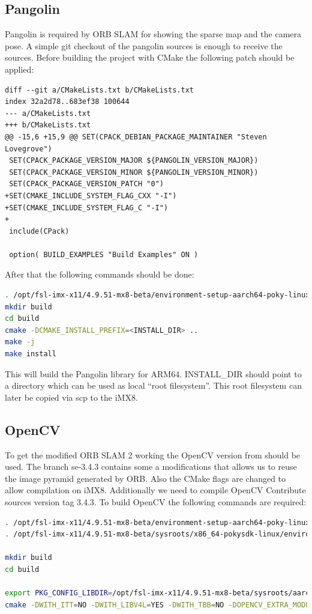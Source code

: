 \documentclass[11pt,a4paper,titlepage,oneside]{report}
\begin{document}
\subsection{Pangolin}
Pangolin \cite{pangolin} is required by ORB SLAM for showing the sparse map and the camera pose. A simple git checkout of the pangolin sources is enough to receive the sources. Before building the project with CMake the following patch should be applied:
\begin{lstlisting}
diff --git a/CMakeLists.txt b/CMakeLists.txt
index 32a2d78..683ef38 100644
--- a/CMakeLists.txt
+++ b/CMakeLists.txt
@@ -15,6 +15,9 @@ SET(CPACK_DEBIAN_PACKAGE_MAINTAINER "Steven Lovegrove")
 SET(CPACK_PACKAGE_VERSION_MAJOR ${PANGOLIN_VERSION_MAJOR})
 SET(CPACK_PACKAGE_VERSION_MINOR ${PANGOLIN_VERSION_MINOR})
 SET(CPACK_PACKAGE_VERSION_PATCH "0")
+SET(CMAKE_INCLUDE_SYSTEM_FLAG_CXX "-I")
+SET(CMAKE_INCLUDE_SYSTEM_FLAG_C "-I")
+
 include(CPack)
 
 option( BUILD_EXAMPLES "Build Examples" ON )
\end{lstlisting}

After that the following commands should be done:
\begin{lstlisting}[language=bash]
. /opt/fsl-imx-x11/4.9.51-mx8-beta/environment-setup-aarch64-poky-linux
mkdir build
cd build
cmake -DCMAKE_INSTALL_PREFIX=<INSTALL_DIR> ..
make -j
make install
\end{lstlisting}

This will build the Pangolin library for ARM64. INSTALL\_DIR should point to a directory which can be used as local ``root filesystem''. This root filesystem can later be copied via scp to the iMX8.

\subsection{OpenCV}\label{sec:opencv}
To get the modified ORB SLAM 2 working the OpenCV version from \cite{opencv_se} should be used. The branch se-3.4.3 contains some a modifications that allows us to reuse the image pyramid generated by ORB. Also the CMake flags are changed to allow compilation on iMX8. Additionally we need to compile OpenCV Contribute \cite{opencv_contrib} sources version tag 3.4.3. To build OpenCV the following commands are required:
\begin{lstlisting}[language=bash]
. /opt/fsl-imx-x11/4.9.51-mx8-beta/environment-setup-aarch64-poky-linux
. /opt/fsl-imx-x11/4.9.51-mx8-beta/sysroots/x86_64-pokysdk-linux/environment-setup.d/cmake.sh

mkdir build
cd build

export PKG_CONFIG_LIBDIR=/opt/fsl-imx-x11/4.9.51-mx8-beta/sysroots/aarch64-poky-linux/usr/lib/pkgconfig/
cmake -DWITH_ITT=NO -DWITH_LIBV4L=YES -DWITH_TBB=NO -DOPENCV_EXTRA_MODULES_PATH=<path to OpenCV contrib> -DCMAKE_BUILD_TYPE=Release ..
\end{lstlisting}
\end{document}
